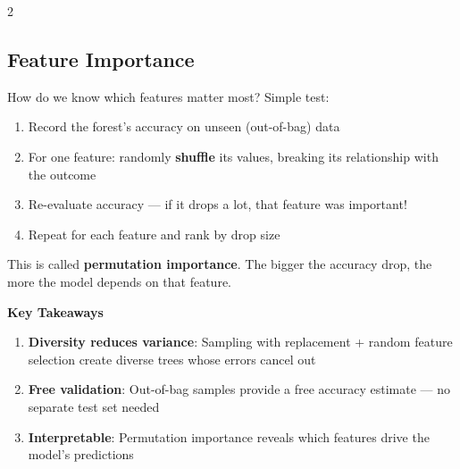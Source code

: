\documentclass[10pt,a4paper]{article}
\begin{document}
\begin{multicols}{2}
\vspace{8pt}

\subsection{Feature Importance}

How do we know which features matter most? Simple test:
\begin{enumerate}
  \item Record the forest's accuracy on unseen (out-of-bag) data
  \item For one feature: randomly \textbf{shuffle} its values, breaking its relationship with the outcome
  \item Re-evaluate accuracy --- if it drops a lot, that feature was important!
  \item Repeat for each feature and rank by drop size
\end{enumerate}
{\small This is called \textbf{permutation importance}. The bigger the accuracy drop, the more the model depends on that feature.}

\end{multicols}

\vspace{4pt}

\begin{center}
\colorbox{lightbg}{\parbox{0.92\textwidth}{\centering
\textbf{\large\color{accent} Key Takeaways}\\[4pt]
\begin{minipage}{0.88\textwidth}
\begin{enumerate}
  \item \textbf{\color{sky}Diversity reduces variance}: Sampling with replacement + random feature selection create diverse trees whose errors cancel out
  \item \textbf{\color{amber}Free validation}: Out-of-bag samples provide a free accuracy estimate --- no separate test set needed
  \item \textbf{\color{purple}Interpretable}: Permutation importance reveals which features drive the model's predictions
\end{enumerate}
\end{minipage}}}
\end{center}
\end{document}
